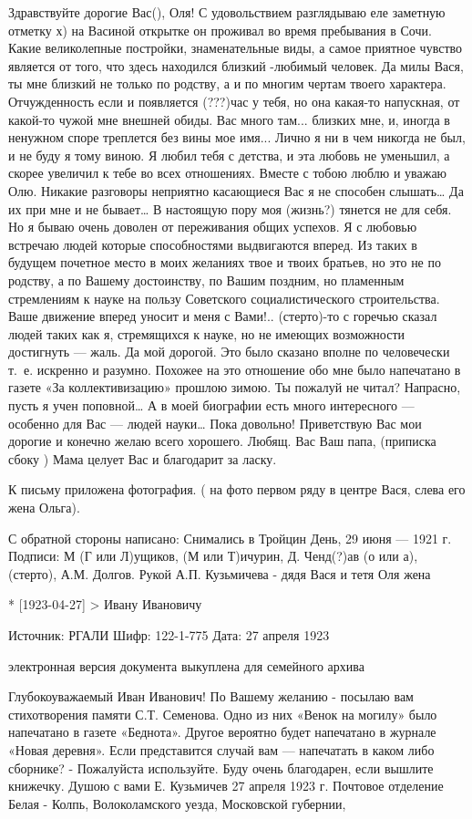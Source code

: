 Здравствуйте дорогие Вас(), Оля!
С удовольствием разглядываю еле заметную отметку х) на  Васиной открытке он проживал во время пребывания в Сочи. Какие великолепные постройки, знаменательные виды, а самое приятное чувство является от того, что здесь находился близкий -любимый человек. Да милы Вася, ты мне близкий не только по родству, а и по многим чертам твоего характера. Отчужденность если и появляется (???)час у тебя, но она какая-то напускная, от какой-то чужой  мне внешней обиды. Вас много там... близких мне, и, иногда в ненужном споре треплется без вины мое имя... Лично я ни в чем никогда не был, и не буду я тому виною. Я любил тебя с детства, и эта любовь не уменьшил, а скорее увеличил к тебе во всех отношениях. Вместе с тобою люблю и уважаю Олю. Никакие разговоры неприятно касающиеся Вас я не способен слышать… Да их при мне и не бывает…
В настоящую пору моя (жизнь?) тянется не для себя. Но я бываю очень доволен от переживания общих успехов. Я с любовью встречаю людей которые способностями выдвигаются вперед. Из таких в будущем почетное место в моих желаниях твое и твоих братьев, но это не по родству, а по Вашему достоинству, по Вашим поздним, но пламенным стремлениям к науке на пользу Советского социалистического строительства. 
Ваше движение вперед уносит и меня с Вами!..
(стерто)-то с горечью сказал людей таких как я, стремящихся к науке, но не имеющих возможности достигнуть — жаль. Да мой дорогой. Это было сказано вполне по человечески т. е. искренно и разумно. Похожее на это отношение обо мне было напечатано в газете «За коллективизацию» прошлою зимою. Ты пожалуй не читал? Напрасно, пусть я учен поповной… А в моей биографии есть много интересного — особенно для Вас — людей науки… Пока довольно! Приветствую Вас мои дорогие и конечно желаю всего хорошего.
Любящ. Вас Ваш папа,
(приписка сбоку ) Мама целует Вас и благодарит за ласку.

К письму приложена фотография. ( на фото первом ряду в центре Вася, слева его жена Ольга).  

С обратной стороны написано:
Снимались в Тройцин День, 29 июня — 1921 г.
Подписи: М (Г или Л)ущиков, (М или Т)ичурин, Д. Ченд(?)ав (о или а),  (стерто), А.М. Долгов. 
Рукой А.П. Кузьмичева -  дядя Вася и тетя Оля жена 

* [1923-04-27] > Ивану Ивановичу 

Источник: РГАЛИ
Шифр: 122-1-775
Дата: 27 апреля 1923

электронная версия документа выкуплена для семейного архива

Глубокоуважаемый Иван Иванович!
По Вашему желанию - посылаю вам стихотворения памяти С.Т. Семенова. Одно из них «Венок на могилу» было напечатано в газете «Беднота». Другое вероятно будет напечатано в журнале «Новая деревня». Если представится случай вам — напечатать в каком либо сборнике? - Пожалуйста используйте. Буду очень благодарен, если вышлите книжечку.
Душою с вами Е. Кузьмичев
27 апреля 1923 г.
Почтовое отделение Белая - Колпь, Волоколамского уезда, Московской губернии,


